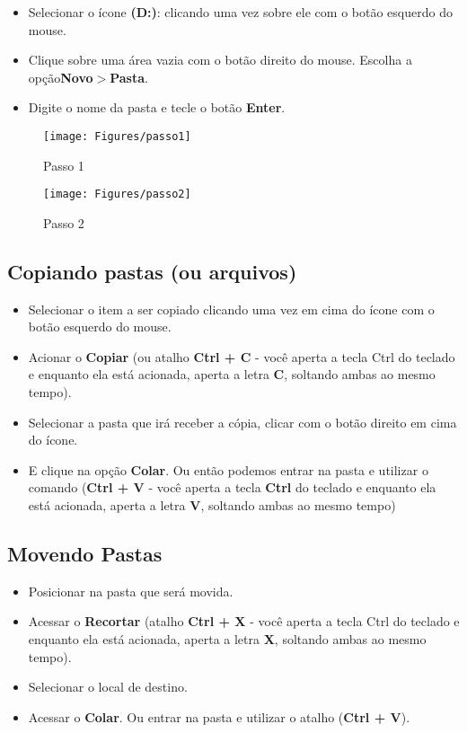 \documentclass[12pt]{article}
\begin{document}
		\begin{itemize}
			\item Selecionar o ícone {\bf(D:)}: clicando uma vez sobre ele com o botão esquerdo do mouse.
			\item Clique sobre uma área vazia com o botão direito do mouse. Escolha a opção{\bf Novo$>$Pasta}.
			\item Digite o nome da pasta e tecle o botão {\bf Enter}.
		\end{itemize}
		
		\begin{figure}[!h]
			\centering
			\texttt{[image: Figures/passo1]}
			\caption{Passo 1}
			\label{fig:passo1}
		\end{figure}
		
		
		\begin{figure}[!h]
			\centering
			\texttt{[image: Figures/passo2]}
			\caption{Passo 2}
			\label{fig:passo2}
		\end{figure}
		
		\newpage
		\subsection{Copiando pastas (ou arquivos)}
		
		\begin{itemize}
			
			\item Selecionar o item a ser copiado clicando uma vez em cima do ícone com o botão esquerdo do mouse.
			\item Acionar o {\bf Copiar} (ou atalho {\bf Ctrl + C} - você aperta a tecla Ctrl do teclado e enquanto ela está acionada, aperta a letra {\bf C}, soltando ambas ao mesmo tempo).
			\item Selecionar a pasta que irá receber a cópia, clicar com o botão direito em cima do ícone.
			\item E clique na opção {\bf Colar}. Ou então podemos entrar na pasta e utilizar o comando ({\bf Ctrl + V} - você aperta a tecla {\bf Ctrl} do teclado e enquanto ela está acionada, aperta a letra {\bf V}, soltando ambas ao mesmo tempo)
		\end{itemize}
		
		\subsection{Movendo Pastas}
		
		\begin{itemize}
			\item Posicionar na pasta que será movida.
			\item Acessar o {\bf Recortar} (atalho {\bf Ctrl + X} - você aperta a tecla Ctrl do teclado e enquanto ela está acionada, aperta a letra {\bf X}, soltando ambas ao mesmo tempo).
			\item Selecionar o local de destino.
			\item Acessar o {\bf Colar}. Ou entrar na pasta e utilizar o atalho ({\bf Ctrl + V}).
		\end{itemize}
		
\end{document}
